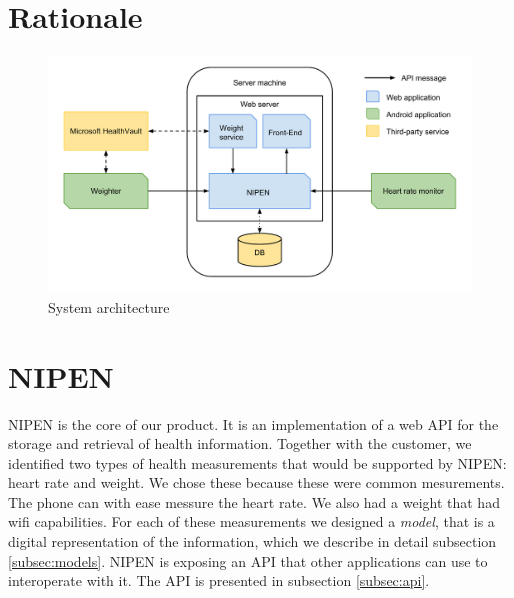 \section{Rationale}

\begin{figure}[h]
\centering
\includegraphics[scale=0.5]{../Figures/architecture.pdf}
\caption{System architecture}
\label{figure:architecture}
\end{figure}

\section{NIPEN}

NIPEN is the core of our product. 
It is an implementation of a web API for the storage and retrieval of health information.
Together with the customer, we identified two types of health measurements that would be supported by NIPEN: heart rate and weight.
We chose these because these were common mesurements.
The phone can with ease messure the heart rate.
We also had a weight that had wifi capabilities.
For each of these measurements we designed a \textit{model}, that is a digital representation of the information, which we describe in detail subsection \ref{subsec:models}.
NIPEN is exposing an API that other applications can use to interoperate with it.
The API is presented in subsection \ref{subsec:api}.

